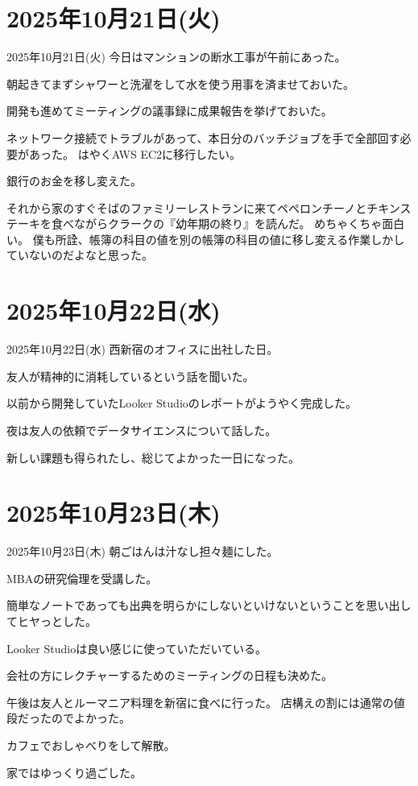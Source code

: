 \documentclass[dvipdfmx, autodetect-engine, aspectratio=169, 10.5pt]{beamer}
\begin{document}
\section{2025年10月21日(火)}

\begin{frame}{2025年10月21日(火)}
今日はマンションの断水工事が午前にあった。

朝起きてまずシャワーと洗濯をして水を使う用事を済ませておいた。

開発も進めてミーティングの議事録に成果報告を挙げておいた。

ネットワーク接続でトラブルがあって、本日分のバッチジョブを手で全部回す必要があった。
はやくAWS EC2に移行したい。

銀行のお金を移し変えた。

それから家のすぐそばのファミリーレストランに来てペペロンチーノとチキンステーキを食べながらクラークの『幼年期の終り』を読んだ。
めちゃくちゃ面白い。
僕も所詮、帳簿の科目の値を別の帳簿の科目の値に移し変える作業しかしていないのだよなと思った。
\end{frame}

\section{2025年10月22日(水)}

\begin{frame}{2025年10月22日(水)}
西新宿のオフィスに出社した日。

友人が精神的に消耗しているという話を聞いた。

以前から開発していたLooker Studioのレポートがようやく完成した。

夜は友人の依頼でデータサイエンスについて話した。

新しい課題も得られたし、総じてよかった一日になった。
\end{frame}

\section{2025年10月23日(木)}

\begin{frame}{2025年10月23日(木)}
朝ごはんは汁なし担々麺にした。

MBAの研究倫理を受講した。

簡単なノートであっても出典を明らかにしないといけないということを思い出してヒヤっとした。

Looker Studioは良い感じに使っていただいている。

会社の方にレクチャーするためのミーティングの日程も決めた。

午後は友人とルーマニア料理を新宿に食べに行った。
店構えの割には通常の値段だったのでよかった。

カフェでおしゃべりをして解散。

家ではゆっくり過ごした。
\end{frame}
\end{document}
